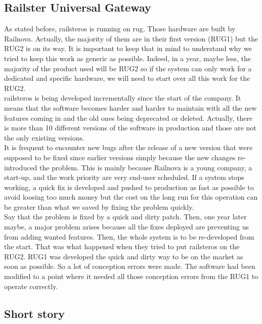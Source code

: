 \documentclass[12pt]{article}
\theoremstyle{definition}
\theoremstyle{definition}
\theoremstyle{remark}
\begin{document}
\subsection{Railster Universal Gateway}

As stated before, \gls{railsteros} is running on \gls{rug}. Those hardware are built by Railnova. Actually, the majority of them are in their first version (RUG1) but the RUG2 is on its way. It is important to keep that in mind to understand why we tried to keep this work as generic as possible. Indeed, in a year, maybe less, the majority of the product used will be RUG2 so if the system can only work for a dedicated and specific hardware, we will need to start over all this work for the RUG2.\\

\gls{railsteros} is being developed incrementally since the start of the company. It means that the software becomes harder and harder to maintain with all the new features coming in and the old ones being deprecated or deleted. Actually, there is more than 10 different versions of the software in production and those are not the only existing versions.\\

It is frequent to encounter new bugs after the release of a new version that were supposed to be fixed since earlier versions simply because the new changes re-introduced the problem. This is mainly because Railnova is a young company, a start-up, and the work priority are very end-user scheduled. If a system stops working, a quick fix is developed and pushed to production as fast as possible to avoid loosing too much money but the cost on the long run for this operation can be greater than what we saved by fixing the problem quickly.\\

Say that the problem is fixed by a quick and dirty patch. Then, one year later maybe, a major problem arises because all the fixes deployed are preventing us from adding wanted features. Then, the whole system is to be re-developed from the start. That was what happened when they tried to put \gls{railsteros} on the RUG2. RUG1 was developed the quick and dirty way to be on the market as soon as possible. So a lot of conception errors were made. The software had been modified to a point where it needed all those conception errors from the RUG1 to operate correctly.


\subsection{Short story}
\end{document}
